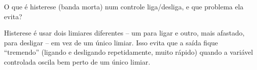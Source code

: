 \question[3] O que é histerese (banda morta) num controle liga/desliga, e que problema ela evita?

\begin{solution}
Histerese é usar dois limiares diferentes -- um para ligar e outro, mais afastado, para desligar -- em vez de um único limiar. Isso evita que a saída fique ``tremendo'' (ligando e desligando repetidamente, muito rápido) quando a variável controlada oscila bem perto de um único limiar.
\end{solution}
